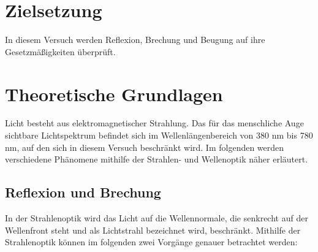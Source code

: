 \section{Zielsetzung}
In diesem Versuch werden Reflexion, Brechung und Beugung auf ihre Gesetzmäßigkeiten überprüft.

\section{Theoretische Grundlagen}
Licht besteht aus elektromagnetischer Strahlung.
Das für das menschliche Auge sichtbare Lichtspektrum befindet sich im Wellenlängenbereich von 380 nm bis 780 nm, 
auf den sich in diesem Versuch beschränkt wird.
Im folgenden werden verschiedene Phänomene mithilfe der Strahlen- und Wellenoptik näher erläutert.

\subsection{Reflexion und Brechung}
In der Strahlenoptik wird das Licht auf die Wellennormale, 
die senkrecht auf der Wellenfront steht und als Lichtstrahl bezeichnet wird, beschränkt.
Mithilfe der Strahlenoptik können im folgenden zwei Vorgänge genauer betrachtet werden:

